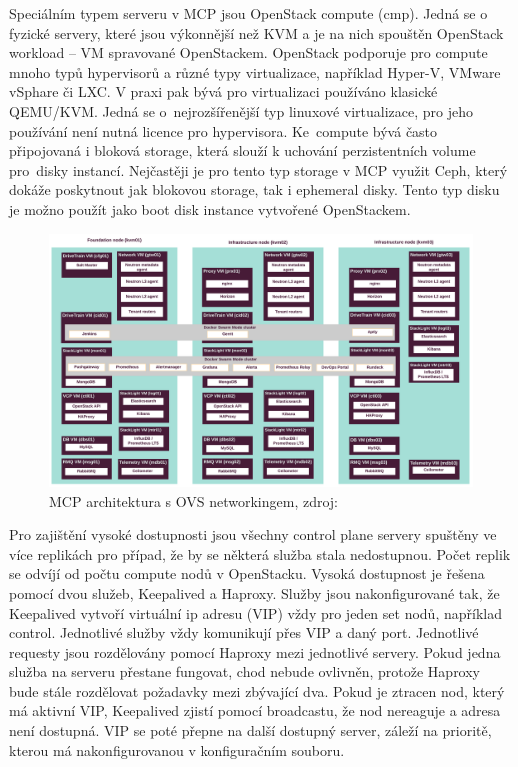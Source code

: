 Speciálním typem serveru v MCP jsou OpenStack compute (cmp). Jedná se o fyzické servery, které jsou výkonnější než KVM a je na nich spouštěn OpenStack workload – VM spravované OpenStackem. OpenStack podporuje pro compute mnoho typů hypervisorů a různé typy virtualizace, například Hyper-V, VMware vSphare či LXC. V praxi pak bývá pro virtualizaci používáno klasické QEMU/KVM. Jedná se o nejrozšířenější typ linuxové virtualizace, pro jeho používání není nutná licence pro hypervisora. Ke compute bývá často připojovaná i bloková storage, která slouží k uchování perzistentních volume pro disky instancí. Nejčastěji je pro tento typ storage v MCP využit Ceph, který dokáže poskytnout jak blokovou storage, tak i ephemeral disky. Tento typ disku je možno použít jako boot disk instance vytvořené OpenStackem.

\begin{figure}[H]
\begin{centering}
\includegraphics[width=1\textwidth]{img/mcp_ovs.png}
\par\end{centering}
\caption{MCP architektura s OVS networkingem, zdroj: \cite{mcp_arch_comp}} \label{fig:mcp_arch}
\end{figure}

Pro zajištění vysoké dostupnosti jsou všechny control plane servery spuštěny ve více replikách pro případ, že by se některá služba stala nedostupnou. Počet replik se odvíjí od počtu compute nodů v OpenStacku. Vysoká dostupnost je řešena pomocí dvou služeb, Keepalived a Haproxy. Služby jsou nakonfigurované tak, že Keepalived vytvoří virtuální ip adresu (VIP) vždy pro jeden set nodů, například control. Jednotlivé služby vždy komunikují přes VIP a daný port. Jednotlivé requesty jsou rozdělovány pomocí Haproxy mezi jednotlivé servery. Pokud jedna služba na serveru přestane fungovat, chod nebude ovlivněn, protože Haproxy bude stále rozdělovat požadavky mezi zbývající dva. Pokud je ztracen nod, který má aktivní VIP, Keepalived zjistí pomocí broadcastu, že nod nereaguje a adresa není dostupná. VIP se poté přepne na další dostupný server, záleží na prioritě, kterou má nakonfigurovanou v konfiguračním souboru.

